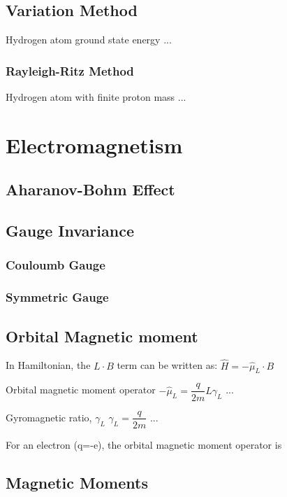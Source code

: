 \documentclass[12pt,a4paper]{article}
\begin{document}
\subsection{Variation Method}
\begin{example}
    {Hydrogen atom ground state energy}
    {...}
\end{example}
\subsubsection{Rayleigh-Ritz Method}
\begin{example}
    {Hydrogen atom with finite proton mass}
    {...}
\end{example}
\section{Electromagnetism}
\subsection{Aharanov-Bohm Effect}
\subsection{Gauge Invariance}
\subsubsection{Couloumb Gauge}
\subsubsection{Symmetric Gauge}
\subsection{Orbital Magnetic moment}
In Hamiltonian, the $L\cdot B$ term can be written as:
$\hat{H} = - \hat{\mu}_L\cdot B$
\begin{definition}
    {Orbital magnetic moment operator}
    {$- \hat{\mu}_L = \dfrac{q}{2m}\hat{L} \gamma_L$}
    {...}
\end{definition}
\begin{definition}
    {Gyromagnetic ratio, $\gamma_L$}
    {$\gamma_L = \dfrac{q}{2m}$}
    {...}
\end{definition}
For an electron (q=-e), the orbital magnetic moment operator is 
\subsection{Magnetic Moments}
\end{document}
